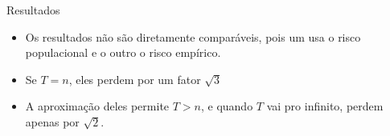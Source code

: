 \documentclass{beamer}
\begin{document}
\begin{frame}{Resultados}
    \begin{itemize}
        \item Os resultados não são diretamente comparáveis, pois um usa o risco populacional e o outro o risco empírico.
        \item Se $T=n$, eles perdem por um fator $\sqrt{3}$
        \item A aproximação deles permite $T>n$, e quando $T$ vai pro infinito, perdem apenas por $\sqrt{2}$.
    \end{itemize}
\end{frame}
\end{document}

